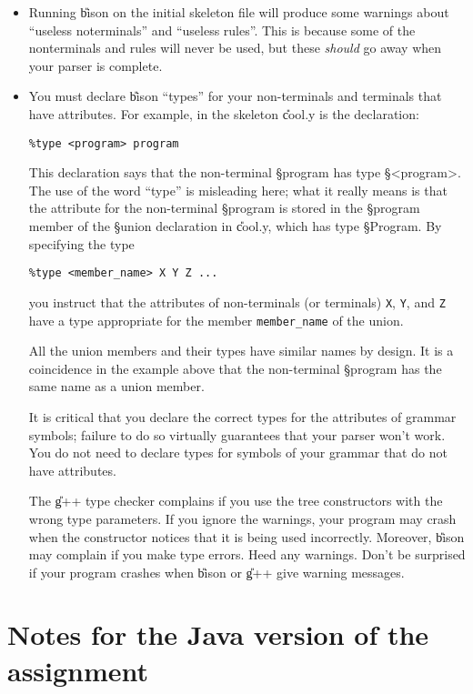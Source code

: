 \documentclass[11pt]{article}
\begin{document}
\begin{itemize}

\item Running \U{bison} on the initial skeleton file will produce some
      warnings about ``useless noterminals'' and ``useless rules''.
      This is because some of the nonterminals and rules will
      never be used, but these \emph{should} go away when your parser
      is complete.

\item You must declare \U{bison} ``types'' for your non-terminals and
terminals that have attributes.  For example, in the skeleton
\U{cool.y} is the declaration:
\begin{verbatim}
%type <program> program
\end{verbatim}
This declaration says that the non-terminal \S{program} has type \S{<program>}.
The use of the word ``type'' is misleading here; what it really means is that
the attribute for the non-terminal \S{program} is stored in the \S{program}
member of the \S{union} declaration in \U{cool.y}, which has type
\S{Program}.   By specifying the type  
\begin{verbatim}
%type <member_name> X Y Z ...
\end{verbatim}
you instruct  that the attributes of non-terminals (or terminals)
{\tt X}, {\tt Y}, and {\tt Z} have a type appropriate for the member
{\tt member\_name} of the union.

All the union members and their types have similar names by design.
It is a coincidence in the example above that the non-terminal
\S{program} has the same name as a union member.

It is critical that you declare the correct types for the attributes
of grammar symbols; failure to do so virtually guarantees that your
parser won't work.  You do not need to declare types for symbols of
your grammar that do not have attributes.

The \U{g++} type checker complains if you use the tree constructors
with the wrong type parameters.  If you ignore the warnings, your
program may crash when the constructor notices that it is being used
incorrectly.  Moreover, \U{bison} may complain if you make type
errors.  Heed any warnings.  Don't be surprised if your program
crashes when \U{bison} or \U{g++} give warning messages.

\end{itemize}

\section{Notes for the Java version of the assignment}
\end{document}
